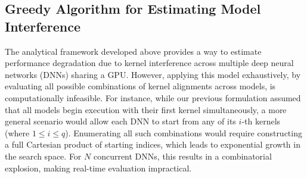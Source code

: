 



\subsection{Greedy Algorithm for Estimating Model Interference}

The analytical framework developed above provides a way to estimate performance degradation due to kernel interference across multiple deep neural networks (DNNs) sharing a GPU. However, applying this model exhaustively, by evaluating all possible combinations of kernel alignments across models, is computationally infeasible. For instance, while our previous formulation assumed that all models begin execution with their first kernel simultaneously, a more general scenario would allow each DNN to start from any of its $i$-th kernels (where $1 \leq i \leq q$). Enumerating all such combinations would require constructing a full Cartesian product of starting indices, which leads to exponential growth in the search space. For $N$ concurrent DNNs, this results in a combinatorial explosion, making real-time evaluation impractical.

